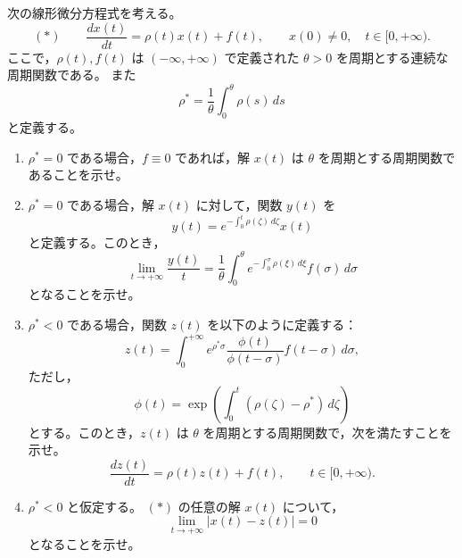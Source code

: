 \documentclass[12pt]{jlreq}
\begin{document}
次の線形微分方程式を考える。
\[
  (*)\qquad
  \frac{dx(t)}{dt}=\rho(t)x(t)+f(t),\qquad
  x(0)\ne0,\quad t\in[0,+\infty).
\]
ここで，\(\rho(t),f(t)\) は \((-\infty,+\infty)\) で定義された \(\theta>0\) を周期とする連続な周期関数である。
また
\[
  \rho^*=\frac1\theta\int_0^\theta \rho(s)\,ds
\]
と定義する。

\begin{enumerate}
  \item \(\rho^*=0\) である場合，\(f\equiv0\) であれば，解 \(x(t)\) は \(\theta\) を周期とする周期関数であることを示せ。
  \item \(\rho^*=0\) である場合，解 \(x(t)\) に対して，関数 \(y(t)\) を
  \[
    y(t)=e^{-\int_0^t\rho(\zeta)\,d\zeta}x(t)
  \]
  と定義する。このとき，
  \[
    \lim_{t\to+\infty}\frac{y(t)}{t}
      =\frac1\theta\int_0^\theta
      e^{-\int_0^\sigma \rho(\xi)\,d\xi}f(\sigma)\,d\sigma
  \]
  となることを示せ。
  \item \(\rho^*<0\) である場合，関数 \(z(t)\) を以下のように定義する：
  \[
    z(t)=\int_0^{+\infty}
      e^{\rho^*\sigma}\frac{\phi(t)}{\phi(t-\sigma)}f(t-\sigma)\,d\sigma,
  \]
  ただし，
  \[
    \phi(t)=\exp\left(\int_0^t(\rho(\zeta)-\rho^*)\,d\zeta\right)
  \]
  とする。このとき，\(z(t)\) は \(\theta\) を周期とする周期関数で，次を満たすことを示せ。
  \[
    \frac{dz(t)}{dt}=\rho(t)z(t)+f(t),\qquad t\in[0,+\infty).
  \]
  \item \(\rho^*<0\) と仮定する。 \((*)\) の任意の解 \(x(t)\) について，
  \[
    \lim_{t\to+\infty}|x(t)-z(t)|=0
  \]
  となることを示せ。
\end{enumerate}
\end{document}
